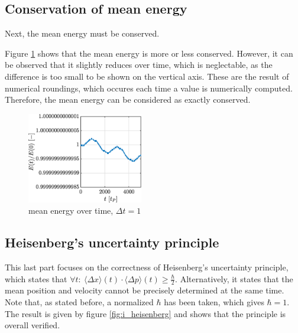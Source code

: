 \documentclass[a4paper,12pt,twoside]{article}
\begin{document}
  \subsection{Conservation of mean energy}
    Next, the mean energy must be conserved.

    Figure \ref{fig:i_E} shows that the mean energy is more or less conserved.
    However, it can be observed that it slightly reduces over time, which is neglectable, as the difference is too small to be shown on the vertical axis.
    These are the result of numerical roundings, which occures each time a value is numerically computed.
    Therefore, the mean energy can be considered as exactly conserved.

    \begin{figure}[h]
      \centering
      \includegraphics[width=0.45\textwidth]{graphs/i_E.eps}
      \caption{mean energy over time, $\Delta t = 1$}
      \label{fig:i_E}
    \end{figure}

  \subsection{Heisenberg's uncertainty principle}
    This last part focuses on the correctness of Heisenberg's uncertainty principle, which states that $\forall t:~\langle \Delta x \rangle(t)\cdot\langle \Delta p \rangle(t) \geq \frac{\hbar}{2}$.
    Alternatively, it states that the mean position and velocity cannot be precisely determined at the same time.
    Note that, as stated before, a normalized $\hbar$ has been taken, which gives $\hbar=1$.\\ %

    The result is given by figure \ref{fig:i_heisenberg} and shows that the principle is overall verified.
\end{document}
